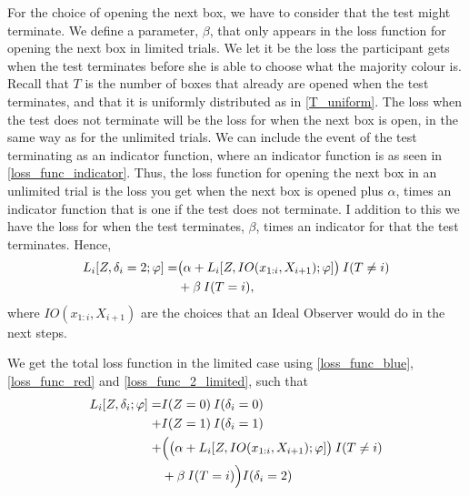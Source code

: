 For the choice of opening the next box, we have to consider that the test might terminate. 
We define a parameter, $\beta$, that only appears in the loss function for opening the next box in limited trials. 
We let it be the loss the participant gets when the test terminates before she is able to choose what the majority colour is.
Recall that $T$ is the number of boxes that already are opened when the test terminates, and that it is uniformly distributed as in \eqref{T_uniform}. The loss when the test does not terminate will be the loss for when the next box is open, in the same way as for the unlimited trials. We can include the event of the test terminating as an indicator function, where an indicator function is as seen in \eqref{loss_func_indicator}. Thus, the loss function for opening the next box in an unlimited trial is the loss you get when the next box is opened plus $\alpha$, times an indicator function that is one if the test does not terminate. I addition to this we have the loss for when the test terminates, $\beta$, times an indicator for that the test terminates. Hence,
\begin{equation}
\label{loss_func_2_limited}
    \begin{aligned}
        L_i[Z,\delta_i=2;\varphi] 
        =& \big( \alpha + L_i[Z,IO(x_{1:i},X_{i+1});\varphi] \big) \: I(T\neq i) \\
        &+ \beta \: I(T=i),
    \end{aligned}
\end{equation}
where $IO(x_{1:i},X_{i+1})$ are the choices that an Ideal Observer would do in the next steps. 

We get the total loss function in the limited case using \eqref{loss_func_blue}, \eqref{loss_func_red} and \eqref{loss_func_2_limited}, such that
\begin{equation}
\label{total_loss_limited}
    \begin{aligned}
       L_i[Z,\delta_{i};\varphi] 
       =& I(Z=0)\: I(\delta_i=0) \\
       +& I(Z=1)\: I(\delta_i=1)\\
       +& \Big(  \big( \alpha + L_i[Z,IO(x_{1:i},X_{i+1});\varphi] \big) \: I(T\neq i) \\        
       &+ \beta \: I(T=i)  \Big) I(\delta_i=2)
    \end{aligned}
\end{equation}


